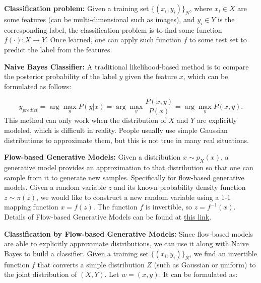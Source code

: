 \documentclass[
  course = {{16-811 Math Fundamentals for Robotics}},
  quartile = {{1}},
  assignment = Classification\ by\ flow-based\ generative\ models,
  name = {{Kangle Deng}},
  email = {{kangled@andrew.cmu.edu}},
  firstexercise = 1
]{aga-document}
\begin{document}
\noindent \textbf{Classification problem:} Given a training set $\{(x_i, y_i)\}_N$, where $x_i \in X$ are some features (can be multi-dimensional such as images), and $y_i \in Y$ is the corresponding label, the classification problem is to find some function $f(\cdot): X \rightarrow Y$. Once learned, one can apply such function $f$ to some test set to predict the label from the features.

\vspace{0.5cm}

\noindent \textbf{Naive Bayes Classifier:} A traditional likelihood-based method is to compare the posterior probability of the label $y$ given the feature $x$, which can be formulated as follows:

\begin{equation*}
    y_{predict} = \arg \max_{y} P(y | x) = \arg \max_{y} \frac{P(x,y)}{P(x)} = \arg \max_{y} P(x,y).
\end{equation*}
This method can only work when the distribution of $X$ and $Y$ are explicitly modeled, which is difficult in reality. People usually use simple Gaussian distributions to approximate them, but this is not true in many real situations.

\vspace{0.5cm}

\noindent \textbf{Flow-based Generative Models:} Given a distribution $x \sim p_X(x)$, a generative model provides an approximation to that distribution so that one can sample from it to generate new samples. Specifically for flow-based generative models. Given a random variable $z$ and its known probability density function $z\sim \pi(z)$, we would like to construct a new random variable using a 1-1 mapping function $x=f(z)$. The function $f$ is invertible, so $z=f^{-1}(x)$. Details of Flow-based Generative Models can be found at \href{https://lilianweng.github.io/lil-log/2018/10/13/flow-based-deep-generative-models.html}{this link}.

\vspace{0.5cm}

\noindent \textbf{Classification by Flow-based Generative Models:} Since flow-based models are able to explicitly approximate distributions, we can use it along with Naive Bayes to build a classifier. Given a training set $\{(x_i, y_i)\}_N$, we find an invertible function $f$ that converts a simple distribution $Z$ (such as Gaussian or uniform) to the joint distribution of $(X,Y)$. Let $w = (x,y)$. It can be formulated as:
\end{document}
